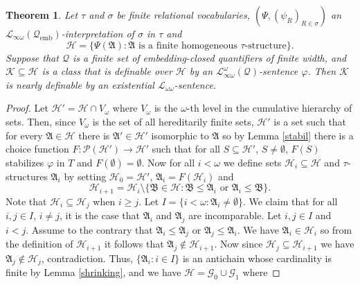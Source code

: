\documentclass{ndjflart}
\theoremstyle{plain}
\newtheorem{theorem}[conjecture]{Theorem}
\theoremstyle{definition}
\numberwithin{equation}{section}
\DeclareMathOperator{\emb}{emb}
\begin{document}
\begin{theorem}\label{log_eq}
Let $\tau$ and $\sigma$ be finite relational vocabularies,
$(\Psi, (\psi_R)_{R \in \sigma})$ an 
$\mathcal{L}_{\infty \omega}(\mathcal{Q}_{\emb})$-interpretation of $\sigma$ in
$\tau$ and
\[
\mathcal{H} = \{\Psi(\mathfrak{A}) 
\colon \mathfrak{A} \text{ is a finite homogeneous } \tau \text{-structure}\}.
\]
Suppose that $\mathcal{Q}$ is a finite set
of embedding-closed quantifiers of finite width, 
and $\mathcal{K} \subseteq \mathcal{H}$
is a class that is definable over $\mathcal{H}$ by an
$\mathcal{L}^{\omega}_{\infty\omega}(\mathcal{Q})$-sentence $\varphi$.
Then $\mathcal{K}$ is nearly definable by an existential 
$\mathcal{L}_{\omega\omega}$-sentence.
\end{theorem}
\begin{proof}
Let $\mathcal{H}' = \mathcal{H} \cap V_{\omega}$ where $V_{\omega}$ is the
$\omega$-th level in the cumulative hierarchy of sets.
Then, since $V_{\omega}$ is the set of all hereditarily finite sets,
$\mathcal{H}'$ is a set such that for every $\mathfrak{A} \in \mathcal{H}$ there
is $\mathfrak{A}' \in \mathcal{H}'$ isomorphic to $\mathfrak{A}$ so by Lemma
\ref{stabil} there is a choice function
$F\colon \mathcal{P}(\mathcal{H}') \rightarrow \mathcal{H}'$ such that
for all $S \subseteq \mathcal{H}'$, $S \ne \emptyset$, $F(S)$ stabilizes
$\varphi$ in $T$ and $F(\emptyset) = \emptyset$.
Now for all $i < \omega$ we define sets $\mathcal{H}_i \subseteq \mathcal{H}$
and $\tau$-structures $\mathfrak{A}_i$ by setting $\mathcal{H}_0 = \mathcal{H}'$,
$\mathfrak{A}_i = F(\mathcal{H}_i)$ and
\[
	\mathcal{H}_{i+1} = \mathcal{H}_i \setminus \{ \mathfrak{B} \in \mathcal{H} \colon 
	\mathfrak{B} \leq \mathfrak{A}_i \text{ or } \mathfrak{A}_i \leq \mathfrak{B} \}.
\]
Note that $\mathcal{H}_i \subseteq \mathcal{H}_j$ when $i \geq j$.
Let $I = \{i<\omega \colon \mathfrak{A}_i \ne \emptyset \}$.
We claim that for all $i,j \in I$, $i \ne j$, it is the case that
$\mathfrak{A}_i$ and $\mathfrak{A}_j$ are incomparable.
Let $i,j \in I$ and $i < j$.
Assume to the contrary that $\mathfrak{A}_i \leq \mathfrak{A}_j$ or
$\mathfrak{A}_j \leq \mathfrak{A}_i$.
We have $\mathfrak{A}_i \in \mathcal{H}_i$ so from the definition of
$\mathcal{H}_{i+1}$ it follows that $\mathfrak{A}_j \notin \mathcal{H}_{i+1}$.
Now since $\mathcal{H}_j \subseteq \mathcal{H}_{i+1}$ we have
$\mathfrak{A}_j \notin \mathcal{H}_j$, contradiction.
Thus, $\{\mathfrak{A}_i\colon i\in I \}$ is an antichain whose cardinality is
finite by Lemma \ref{shrinking}, and we have
$\mathcal{H} = \mathcal{G}_0 \cup \mathcal{G}_1$ where

\end{proof}
\end{document}
